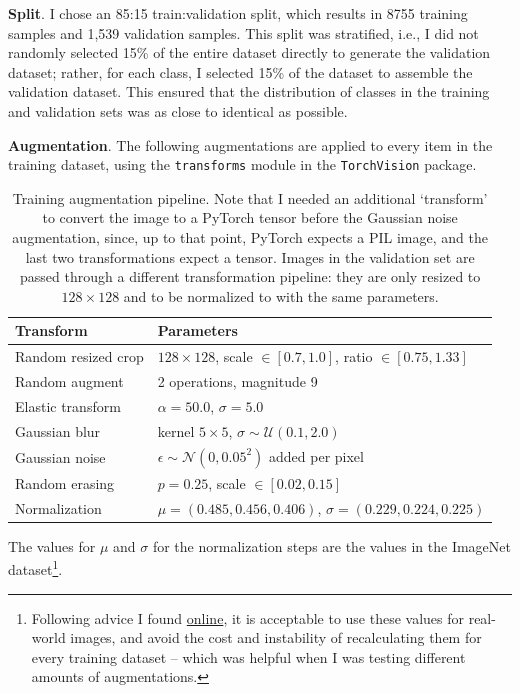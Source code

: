\documentclass[11pt]{article}
\begin{document}
\textbf{Split}. I chose an 85:15 train:validation split, which results in 8755 training samples and 1,539 validation samples. This split was stratified, i.e., I did not randomly selected 15\% of the entire dataset directly to generate the validation dataset; rather, for each class, I selected 15\% of the dataset to assemble the validation dataset. This ensured that the distribution of classes in the training and validation sets was as close to identical as possible.

\textbf{Augmentation}. The following augmentations are applied to every item in the training dataset, using the \texttt{transforms} module in the \texttt{TorchVision} package. 

\begin{table}[H]
\centering
\begin{tabular}{ll}
\toprule
\textbf{Transform} & \textbf{Parameters} \\
\midrule
Random resized crop & $128 \times 128$, scale $\in [0.7, 1.0]$, ratio $\in [0.75, 1.33]$ \\
Random augment & 2 operations, magnitude 9 \\
Elastic transform & $\alpha = 50.0$, $\sigma = 5.0$ \\
Gaussian blur & kernel $5\times 5$, $\sigma \sim \mathcal{U}(0.1, 2.0)$ \\
Gaussian noise & $\epsilon \sim \mathcal{N}(0, 0.05^2)$ added per pixel \\
Random erasing & $p = 0.25$, scale $\in [0.02, 0.15]$ \\
Normalization & $\mu = (0.485, 0.456, 0.406)$, $\sigma = (0.229, 0.224, 0.225)$ \\
\bottomrule
\end{tabular}
\caption{Training augmentation pipeline. Note that I needed an additional `transform' to convert the image to a PyTorch tensor before the Gaussian noise augmentation, since, up to that point, PyTorch expects a PIL image, and the last two transformations expect a tensor. Images in the validation set are passed through a different transformation pipeline: they are only resized to $128 \times 128$ and to be normalized to with the same parameters.}
\label{tab:augmentations}
\end{table}

The values for $\mu$ and $\sigma$ for the normalization steps are the values in the ImageNet dataset\footnote{Following advice I found \href{https://stackoverflow.com/questions/58151507/why-pytorch-officially-use-mean-0-485-0-456-0-406-and-std-0-229-0-224-0-2}{online}, it is acceptable to use these values for real-world images, and avoid the cost and instability of recalculating them for every training dataset -- which was helpful when I was testing different amounts of augmentations.}.
\end{document}
